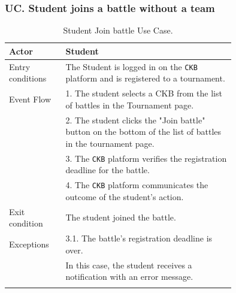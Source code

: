 \subsubsection*{UC\cuc . Student joins a battle without a team}
\begin{center}
    \begin{longtable}{lp{0.75\linewidth}}
        \hline
        Actor            & Student                                                                                                                                                                               \\
        \hline
        Entry conditions & The Student is logged in on the \verb|CKB| platform and is registered to a tournament.                                                                                                            \\
        \hline
        Event Flow       
        & 1. The student selects a CKB from the list of battles in the Tournament page.\\
        & 2. The student clicks the "Join battle" button on the bottom of the list of battles in the tournament page.\\
        & 3. The \verb|CKB| platform verifies the registration deadline for the battle.\\
        & 4. The \verb|CKB| platform communicates the outcome of the student's action.\\
        \hline
        Exit condition   & The student joined the battle.   \\                                                                                                                                                                           
        \hline
        Exceptions   
        & 3.1. The battle's registration deadline is over.\\                                                                                                                                              
            & In this case, the student receives a notification with an error message.   \\                                                               
        \hline
        \caption{Student Join battle Use Case.}
        \label{tab: battle_alone_use_case}
    \end{longtable}


\end{center}
